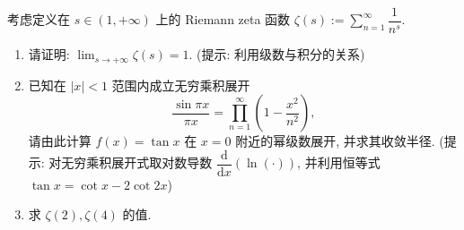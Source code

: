 \begin{question}[points = 12]
考虑定义在 $s \in (1, +\infty)$ 上的 Riemann zeta 函数 $\displaystyle \zeta(s) := \sum_{n=1}^\infty \dfrac{1}{n^{s}}.$
\begin{enumerate}
\item 请证明: $\displaystyle \lim_{s \to +\infty} \zeta(s) = 1.$ (提示: 利用级数与积分的关系)
\item 已知在 $|x| < 1$ 范围内成立无穷乘积展开
\[
\dfrac{\sin \pi x}{\pi x} = \prod_{n=1}^\infty \left( 1 - \dfrac{x^2}{n^2} \right),
\]
请由此计算 $f(x) = \tan x$ 在 $x = 0$ 附近的幂级数展开, 并求其收敛半径. (提示: 对无穷乘积展开式取对数导数 $\displaystyle \dfrac{\mathrm{d}}{\mathrm{d} x} \left( \ln (\cdot) \right)$, 并利用恒等式 $\tan x = \cot x - 2\cot 2x$)
\item 求 $\zeta(2), \zeta(4)$ 的值.
\end{enumerate}

\end{question}

